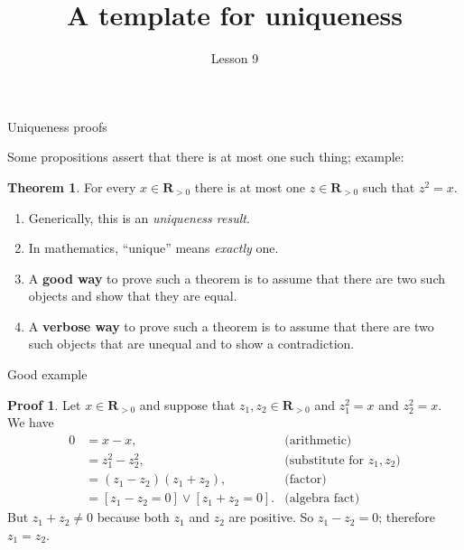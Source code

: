 \documentclass[fleqn]{beamer}
\subtitle{Lesson 9}
\title{\textbf{A template for uniqueness}}
\date{}
\newcommand{\reals}{\mathbf{R}}
\theoremstyle{definition}
\newtheorem{myth}{Theorem}
\newtheorem{myproof}{Proof}
\newenvironment{checklist}{
  \begin{enumerate}[\checkmark]
    \addtolength{\itemsep}{-1.0\itemsep}}
  {\end{enumerate}}
\begin{document}
\frame{\titlepage}

\begin{frame}{Uniqueness  proofs}

Some propositions assert that there is at most one such thing; example:

\begin{myth}  For every \(x \in \reals_{> 0} \) there is at most one \(z \in \reals_{> 0} \) such that 
\(z^2 = x\). \end{myth}

\vspace{0.3in}
\begin{checklist}

\item Generically, this is an \emph{uniqueness result}.

\vspace{0.1in}
\item In mathematics, ``unique'' means \emph{exactly} one.

\vspace{0.1in}
\item A \textbf{good way} to prove such a theorem is to assume that there are two such objects and show that they are equal. 

\vspace{0.1in}
\item A  \textbf{verbose  way} to prove such a theorem is to assume that there are two such objects that are unequal and to show a contradiction.


\end{checklist}

\end{frame}
\begin{frame}{Good example}

\begin{myproof}  Let \(x  \in \reals_{> 0} \) and suppose that \(z_1, z_2 \in \reals_{> 0} \) and \(z_1^2 = x\) and \(z_2^2  = x\). We have
\begin{align*}
   0 &= x - x,  &\mbox{(arithmetic)} \\
      &= z_1^2 - z_2^2,   &\mbox{(substitute for }  z_1, z_2)\\
      &= (z_1 - z_2)(z_1+z_2), &\mbox{(factor)} \\
       &=  [z_1 -  z_2= 0]   \lor [z_1 + z_2 = 0]. &\mbox{(algebra fact)} 
\end{align*}
But \(z_1+z_2 \neq 0\) because both \(z_1\) and \(z_2\) are positive. So \(z_1 - z_2 = 0\); therefore \(z_1 = z_2\).
\end{myproof}
\end{frame}
\end{document}
